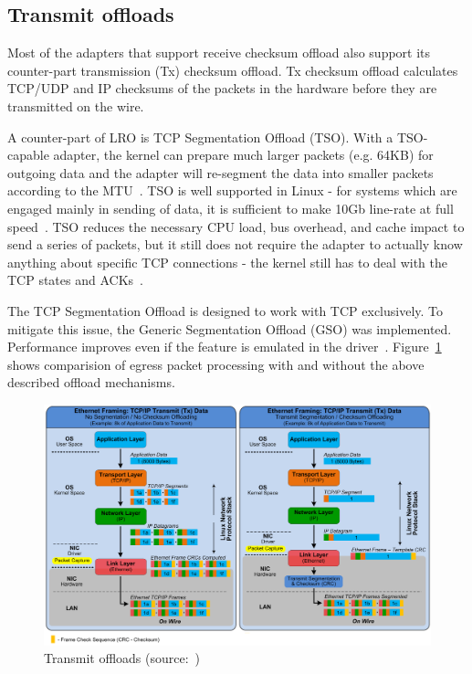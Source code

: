 
\subsection{Transmit offloads}
Most of the adapters that support receive checksum offload
also support its counter-part transmission (Tx) checksum offload.
Tx checksum offload calculates TCP/UDP and
IP checksums of the packets in the hardware before they are transmitted on the wire.

A counter-part of LRO is TCP Segmentation Offload (TSO).
With a TSO-capable adapter, the kernel can prepare much larger packets (e.g. 64KB)
for outgoing data and the adapter will re-segment the data into smaller packets according to the MTU~\cite{jls2009-gro}.
TSO is well supported in Linux -
for systems which are engaged mainly in sending of data,
it is sufficient to make 10Gb line-rate at full speed~\cite{jls2009-gro}.
TSO reduces the necessary CPU load, bus overhead, and cache impact to send a series of packets,
but it still does not require the adapter to actually know
anything about specific TCP connections -
the kernel still has to deal with the TCP states and ACKs~\cite{linux-and-tcp-offload-engines}.

The TCP Segmentation Offload is designed to work with TCP exclusively.
To mitigate this issue, the Generic Segmentation Offload (GSO) was implemented.
Performance improves even if the feature is emulated in the driver~\cite{jls2009-gro}.
Figure~\ref{fig:linux-tx-offloads} shows comparision of egress packet processing
with and without the above described offload mechanisms.
\begin{figure}
	\centering
	\includegraphics[width=15cm,keepaspectratio]{fig/tx-offloads.png}
	\caption{Transmit offloads (source:~\cite{nst-offloads})}
	\label{fig:linux-tx-offloads}
	\bigskip
\end{figure}
